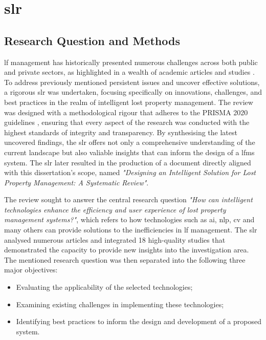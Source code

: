 \section{\acl{slr}} \label{sec:literature-review}

\subsection{Research Question and Methods} \label{subsec:slr}

\ac{lf} management has historically presented numerous challenges across both public and private sectors, as highlighted in a wealth of academic articles and studies \cite{Prawira2024}. To address previously mentioned persistent issues and uncover effective solutions, a rigorous \ac{slr} was undertaken, focusing specifically on innovations, challenges, and best practices in the realm of intelligent lost property management. The review was designed with a methodological rigour that adheres to the PRISMA 2020 guidelines \cite{Page2021}, ensuring that every aspect of the research was conducted with the highest standards of integrity and transparency. By synthesising the latest uncovered findings, the \ac{slr} offers not only a comprehensive understanding of the current landscape but also valiable insights that can inform the design of a \ac{lfms} system. The \ac{slr} later resulted in the production of a document directly aligned with this dissertation's scope, named \textit{"Designing an Intelligent Solution for Lost Property Management: A Systematic Review"}.

The review sought to answer the central research question \textit{"How can intelligent technologies enhance the efficiency and user experience of lost property management systems?"}, which refers to how technologies such as \ac{ai}, \ac{nlp}, \ac{cv} and many others can provide solutions to the inefficiencies in \ac{lf} management. The \ac{slr} analysed numerous articles and integrated 18 high-quality studies that demonstrated the capacity to provide new insights into the investigation area. The mentioned research question was then separated into the following three major objectives:

\begin{itemize}
\item Evaluating the applicability of the selected technologies;
\item Examining existing challenges in implementing these technologies;
\item Identifying best practices to inform the design and development of a proposed system.
\end{itemize}

